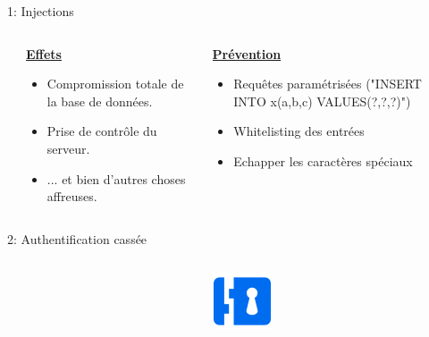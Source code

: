 \documentclass[final,hyperref={pdfpagelabels=false}]{beamer}
\begin{document}
\begin{frame}[t]
\begin{columns}[t]
\begin{column}{.465\textwidth}
\begin{block}{1: Injections}
	\begin{columns}[T]
    \begin{column}{.01\textwidth}
    \end{column}
	\begin{column}{.45\textwidth} %
	\vfill
	\uline{\textbf{Effets}}
	\begin{itemize}
		\item Compromission totale de la base de données.
		\item Prise de contrôle du serveur.
		\item ... et bien d'autres choses affreuses.
	\end{itemize}
		\end{column}

	\begin{column}{.45\textwidth} %
		\vfill
		\uline{\textbf{Prévention}}
		\begin{itemize}
			\item Requêtes paramétrisées ("INSERT INTO x(a,b,c) VALUES(?,?,?)")
			\item Whitelisting des entrées 
			\item Echapper les caractères spéciaux
		\end{itemize}
	\end{column}
	\end{columns}

\end{block}

            
\begin{block}{2: Authentification cassée}

	\begin{columns}[T]

		\begin{column}{.01\textwidth}
		\end{column}
		\begin{column}{.115\textwidth} %
			\includegraphics[scale=2.3]{rimlock.png}
		\end{column}


\end{columns}
\end{block}
\end{column}
\end{columns}
\end{frame}
\end{document}
